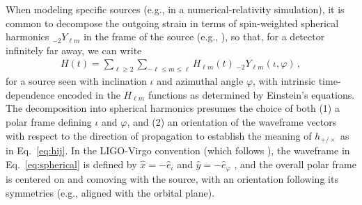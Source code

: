 \documentclass[aps,prd,twocolumn,superscriptaddress,preprintnumbers,floatfix,nofootinbib]{revtex4-2}
\newcommand*{\eq}[1]{Eq.~\eqref{eq:#1}}
\begin{document}
When modeling specific sources (e.g., in a numerical-relativity simulation), it is common to decompose the outgoing strain in terms of spin-weighted spherical harmonics ${}_{-2} Y_{\ell m}$ in the frame of the source (e.g., \cite{Kidder:2007rt}), so that, for a detector infinitely far away, we can write
\begin{align} \label{eq:spherical}
H(t) = \sum_{\ell \geq 2} \sum_{-\ell \leq m \leq \ell} H_{\ell m}(t)\, {}_{-2}Y_{\ell m} (\iota, \varphi)\, ,
\end{align}
for a source seen with inclination $\iota$ and azimuthal angle $\varphi$, with intrinsic time-dependence encoded in the $H_{\ell m}$ functions as determined by Einstein's equations.
The decomposition into spherical harmonics presumes the choice of both (1) a polar frame defining $\iota$ and $\varphi$, and (2) an orientation of the waveframe vectors with respect to the direction of propagation to establish the meaning of $h_{+/\times}$ as in \eq{hij}.
In the LIGO-Virgo convention (which follows \cite{Blanchet:2008je,Faye:2012we}), the waveframe in \eq{spherical} is defined by $\hat{x} = -\hat{e}_\iota$ and $\hat{y} = - \hat{e}_\varphi$ \cite{LALSuite:source}, and the overall polar frame is centered on and comoving with the source, with an orientation following its symmetries (e.g., aligned with the orbital plane).
\end{document}
